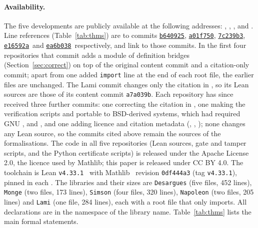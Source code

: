 \documentclass[11pt]{article}
\theoremstyle{definition}
\theoremstyle{remark}
\newcommand{\lean}[1]{\texttt{#1}}
\newcommand{\commitdesargues}{\href{\repo{desargues}/tree/b6409255c844abb6e1cad80b23f8182fc3934116}{\texttt{b640925}}}
\newcommand{\commitmonge}{\href{\repo{monge}/tree/a01f7504d12fd492dd30c66f880905b21cca3895}{\texttt{a01f750}}}
\newcommand{\commitsimson}{\href{\repo{simson}/tree/7c239b31600575db241b45dda4930cf9486e7d17}{\texttt{7c239b3}}}
\newcommand{\commitnapoleon}{\href{\repo{napoleon}/tree/e16592ae04be8e5516a2caef52418c6c60df5165}{\texttt{e16592a}}}
\newcommand{\commitlami}{\href{\repo{lami}/tree/ea6b038b1a3eebd9b02465650901f4b5d4ddaf19}{\texttt{ea6b038}}}
\newcommand{\repo}[1]{https://github.com/jpbald93/#1}
\begin{document}
\paragraph{Availability.}
The five developments are publicly available at the following addresses:
,
,
,
 and
.
Line references (Table~\ref{tab:thms}) are to commits \commitdesargues, \commitmonge,
\commitsimson, \commitnapoleon\ and \commitlami\ respectively, and link to those commits. In the
first four repositories that commit adds a module  of definition bridges
(Section~\ref{sec:correct}) on top of the original content commit and a citation-only commit;
apart from one added \lean{import} line at the end of each root file, the earlier files are
unchanged. The Lami commit changes only the citation in , so its Lean sources are
those of its content commit \texttt{a7a039b}. Each repository has since received three further
commits: one correcting the citation in , one making the verification scripts
 and  portable to BSD-derived systems, which had required GNU
,  and , and one adding licence and citation metadata
(, , ); none changes any Lean source, so the commits
cited above remain the sources of the formalisations. The code in all five repositories (Lean
sources, gate and tamper scripts, and the Python certificate scripts) is released under the Apache
License 2.0, the licence used by Mathlib; this paper is released under CC BY 4.0. The
toolchain is Lean \texttt{v4.33.1}~\cite{Lean4}
with Mathlib~\cite{Mathlib} revision \texttt{0df444a3} (tag \texttt{v4.33.1}), pinned in each
. The libraries and their sizes are \lean{Desargues} (five files,
452 lines), \lean{Monge} (two files, 173 lines), \lean{Simson} (four files, 320 lines),
\lean{Napoleon} (two files, 205 lines) and \lean{Lami} (one file, 284 lines), each with a root file
that only imports. All declarations are in the namespace of the library name. Table~\ref{tab:thms}
lists the main formal statements.
\end{document}
